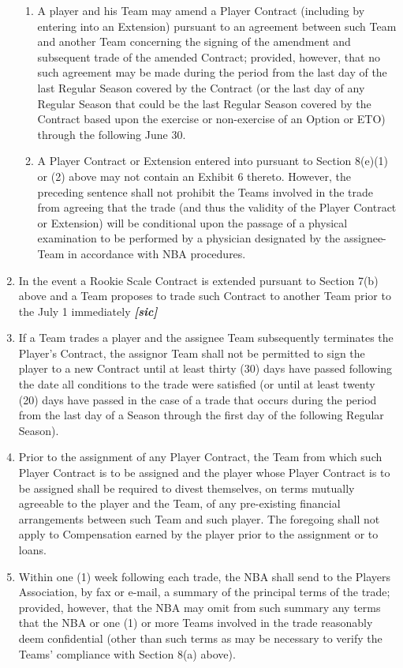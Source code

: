 \documentclass[
]{book}
\begin{document}
\begin{enumerate}
\begin{enumerate}
  \item
    A player and his Team may amend a Player Contract (including by entering into an Extension) pursuant to an agreement between such Team and another Team concerning the signing of the amendment and subsequent trade of the amended Contract; provided, however, that no such agreement may be made during the period from the last day of the last Regular Season covered by the Contract (or the last day of any Regular Season that could be the last Regular Season covered by the Contract based upon the exercise or non-exercise of an Option or ETO) through the following June 30.
  \item
    A Player Contract or Extension entered into pursuant to Section 8(e)(1) or (2) above may not contain an Exhibit 6 thereto. However, the preceding sentence shall not prohibit the Teams involved in the trade from agreeing that the trade (and thus the validity of the Player Contract or Extension) will be conditional upon the passage of a physical examination to be performed by a physician designated by the assignee-Team in accordance with NBA procedures.
  \end{enumerate}
\item
  In the event a Rookie Scale Contract is extended pursuant to Section 7(b) above and a Team proposes to trade such Contract to another Team prior to the July 1 immediately \textbf{\emph{{[}sic{]}}}
\item
  If a Team trades a player and the assignee Team subsequently terminates the Player's Contract, the assignor Team shall not be permitted to sign the player to a new Contract until at least thirty (30) days have passed following the date all conditions to the trade were satisfied (or until at least twenty (20) days have passed in the case of a trade that occurs during the period from the last day of a Season through the first day of the following Regular Season).
\item
  Prior to the assignment of any Player Contract, the Team from which such Player Contract is to be assigned and the player whose Player Contract is to be assigned shall be required to divest themselves, on terms mutually agreeable to the player and the Team, of any pre-existing financial arrangements between such Team and such player. The foregoing shall not apply to Compensation earned by the player prior to the assignment or to loans.
\item
  Within one (1) week following each trade, the NBA shall send to the Players Association, by fax or e-mail, a summary of the principal terms of the trade; provided, however, that the NBA may omit from such summary any terms that the NBA or one (1) or more Teams involved in the trade reasonably deem confidential (other than such terms as may be necessary to verify the Teams' compliance with Section 8(a) above).
\end{enumerate}
\end{document}
